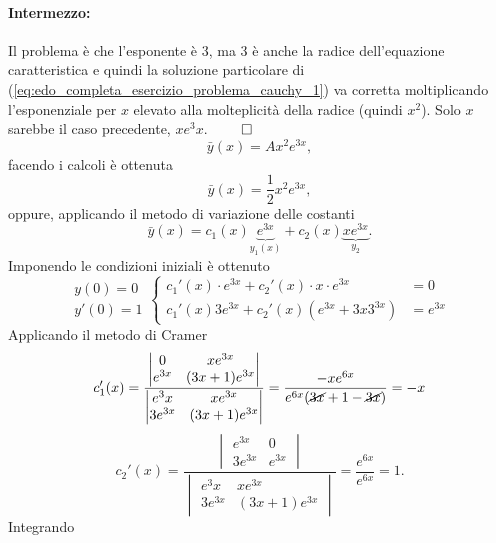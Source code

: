 \begin{example}
	\paragraph{Intermezzo:} Il problema è che l'esponente è 3, ma 3 è anche la radice dell'equazione caratteristica e quindi la soluzione particolare di (\ref{eq:edo_completa_esercizio_problema_cauchy_1}) va corretta moltiplicando l'esponenziale per $x$ elevato alla molteplicità della radice (quindi $x^2$). Solo $x$ sarebbe il caso precedente, $x e^3x$. $\qed$
	\begin{equation*}
		\bar y(x)=Ax^2e^{3x},
	\end{equation*}
	facendo i calcoli è ottenuta
	\begin{equation*}
		\bar y(x) =\frac{1}{2} x^2 e^{3x},
	\end{equation*}
	oppure, applicando il metodo di variazione delle costanti
	\begin{equation*}
		\bar y(x) = c_1(x) \underbrace{e^{3x}}_{y_1(x)} + c_2(x) \underbrace{x e^{3x}}_{y_2}.
	\end{equation*}
	Imponendo le condizioni iniziali è ottenuto
	\begin{equation*}
		\begin{matrix}
			y(0)=0\\
			y'(0)=1
		\end{matrix}
		\begin{cases}
			c_1'(x) \cdot e^{3x} + c_2'(x)\cdot x\cdot e^{3x} &=0\\
			c_1'(x) 3 e^{3x} + c_2'(x) (e^{3x} + 3x3^{3x}) &= e^{3x}
		\end{cases}
	\end{equation*}
	Applicando il metodo di Cramer
	\begin{equation*}
		c_1'(x)=
		\frac{
		\begin{vmatrix}
			0 & x e^{3x}\\
			e^{3x} & (3x+1) e^{3x}
		\end{vmatrix}
		}{
		\begin{vmatrix}
			e^3x & x e^{3x}\\
			3 e^{3x} & (3x+1) e^{3x}
		\end{vmatrix}
		}= \frac{-xe^{6x}}{e^{6x}(\cancel{3x}+1-\cancel{3x})} = -x
	\end{equation*}
	\begin{equation*}
		c_2'(x)=
		\frac{
			\begin{vmatrix}
				e^{3x} & 0\\
				3e^{3x} & e^{3x}
			\end{vmatrix}
		}{
			\begin{vmatrix}
				e^3x & x e^{3x}\\
				3 e^{3x} & (3x+1) e^{3x}
			\end{vmatrix}
		}= \frac{e^{6x}}{e^{6x}} = 1.
	\end{equation*}
	Integrando
	\dsfsw
\end{example}

